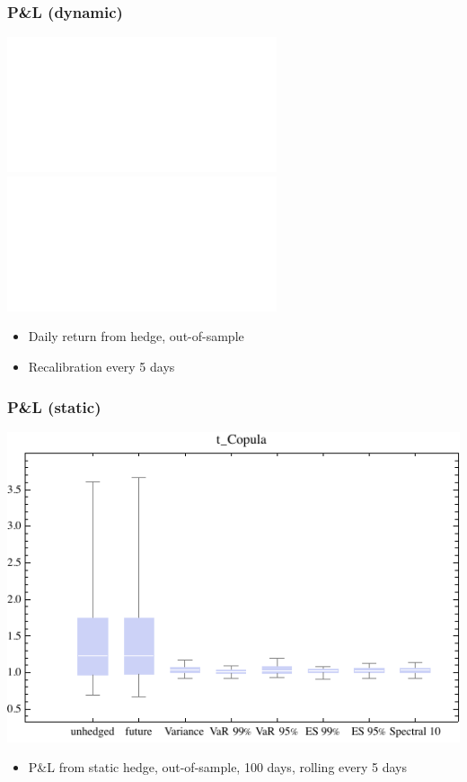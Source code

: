 \documentclass[10pt,mathserif]{beamer}
\renewcommand{\(}{\begin{columns}}
\renewcommand{\)}{\end{columns}}
\newcommand{\<}[1]{\begin{column}{#1}}
\renewcommand{\>}{\end{column}}
\theoremstyle{definition}
\begin{document}
\begin{frame}
  \frametitle{P\&L (dynamic)}
  \begin{center}
    \begin{overprint}
      \includegraphics<1>[scale=.8]{../_pics/PL_dyn_series_Gaussian.pdf}
      \includegraphics<2>[scale=.8]{../_pics/PL_dyn_series_Frank.pdf}
    \end{overprint}
  \end{center}
  \vspace*{-\baselineskip}
  \begin{itemize}
  \item Daily return from hedge, out-of-sample
  \item Recalibration every 5 days\hfill
    \hyperlink{dynamic}{}
  \end{itemize}
\end{frame}

\begin{frame}
  \frametitle{P\&L (static)}
  \begin{center}
    \includegraphics[scale=0.85]{../_pics/PL_static_out_tcop.pdf}    
  \end{center}
  \begin{itemize}
  \item P\&L from static hedge, out-of-sample, 100 days, rolling every 5 days
  \end{itemize}
\end{frame}
\end{document}
